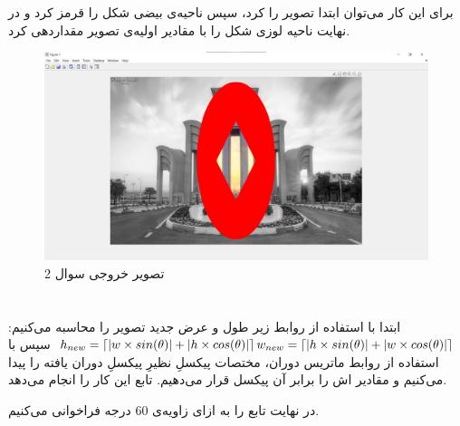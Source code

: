 \documentclass{article}
\begin{document}
\section{}%
برای این کار می‌توان ابتدا تصویر را  کرد، سپس ناحیه‌ی بیضی شکل را قرمز کرد و در نهایت ناحیه لوزی شکل را با مقادیر اولیه‌ی تصویر مقداردهی کرد.
\begin{latin}

\end{latin}

\begin{figure}[H]
    \centering
    \includegraphics[width=1\textwidth]{figures/2a.jpg}
    \caption
	{
تصویر خروجی سوال 2
	}
    \label{fig:fig1}
\end{figure}


\section{}%
ابتدا با استفاده از روابط زیر طول و عرض جدید تصویر را محاسبه می‌کنیم:
\newline
$
h_{new} = \left\lceil \left| w \times sin(\theta) \right| + \left| h \times cos(\theta) \right| \right\rceil
\newline
w_{new} = \left\lceil \left| h \times sin(\theta) \right| + \left| w \times cos(\theta) \right| \right\rceil
\newline
$
سپس با استفاده از روابط ماتریس دوران، مختصات پیکسلِ نظیرِ پیکسلِ دوران یافته را پیدا می‌کنیم و مقادیر اش را برابر آن پیکسل قرار می‌دهیم. تابع  این کار را انجام می‌دهد.


\begin{latin}

\end{latin}
در نهایت تابع را به ازای زاویه‌ی 60 درجه فراخوانی می‌کنیم.
\begin{latin}

\end{latin}
\end{document}
